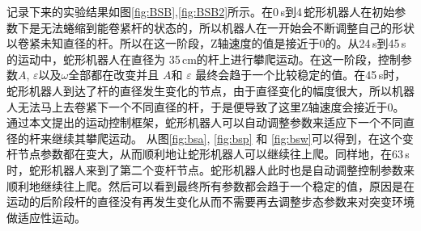 记录下来的实验结果如图\ref{fig:BSB},\ref{fig:BSB2}所示。在0\,s到4\,蛇形机器人在初始参数下是无法蜷缩到能卷紧杆的状态的，所以机器人在一开始会不断调整自己的形状以卷紧未知直径的杆。所以在这一阶段，Z轴速度的值是接近于0的。从24\,s到45\,s的运动中，蛇形机器人在直径为 35\,cm的杆上进行攀爬运动。在这一阶段，控制参数$A$, $\varepsilon$以及$\omega$全部都在改变并且 $A$和 $\varepsilon$ 最终会趋于一个比较稳定的值。在45\,s时，蛇形机器人到达了杆的直径发生变化的节点，由于直径变化的幅度很大，所以机器人无法马上去卷紧下一个不同直径的杆，于是便导致了这里Z轴速度会接近于0。通过本文提出的运动控制框架，蛇形机器人可以自动调整参数来适应下一个不同直径的杆来继续其攀爬运动。 从图\ref{fig:bsa}, \ref{fig:bsp} 和 \ref{fig:bsw}可以得到，在这个变杆节点参数都在变大，从而顺利地让蛇形机器人可以继续往上爬。同样地，在63\,s时，蛇形机器人来到了第二个变杆节点。蛇形机器人此时也是自动调整控制参数来顺利地继续往上爬。然后可以看到最终所有参数都会趋于一个稳定的值，原因是在运动的后阶段杆的直径没有再发生变化从而不需要再去调整步态参数来对突变环境做适应性运动。
